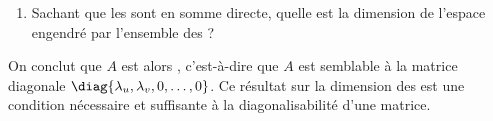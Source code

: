 \documentclass[a4paper,french,bookmarks]{article}
\begin{document}
\begin{enumerate}
        \item Sachant que les  sont en somme directe, quelle est la dimension de l'espace engendré par l'ensemble des  ? 
        
    \end{enumerate}
    
    On conclut que $A$ est alors , c’est-à-dire que $A$ est semblable à la matrice diagonale $\diag{\lambda_u, \lambda_v, 0, \dots, 0}$. Ce résultat sur la dimension des  est une condition nécessaire et suffisante à la diagonalisabilité d’une matrice.
    
\end{document}
